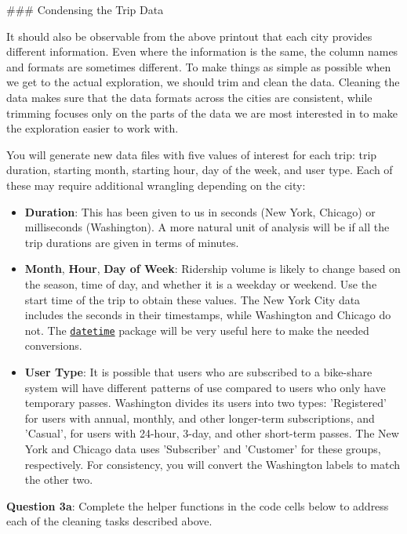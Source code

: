 \documentclass[11pt]{article}
\providecommand{\tightlist}{%
      \setlength{\itemsep}{0pt}\setlength{\parskip}{0pt}}
\begin{document}
 \#\#\# Condensing the Trip Data

It should also be observable from the above printout that each city
provides different information. Even where the information is the same,
the column names and formats are sometimes different. To make things as
simple as possible when we get to the actual exploration, we should trim
and clean the data. Cleaning the data makes sure that the data formats
across the cities are consistent, while trimming focuses only on the
parts of the data we are most interested in to make the exploration
easier to work with.

You will generate new data files with five values of interest for each
trip: trip duration, starting month, starting hour, day of the week, and
user type. Each of these may require additional wrangling depending on
the city:

\begin{itemize}
\tightlist
\item
  \textbf{Duration}: This has been given to us in seconds (New York,
  Chicago) or milliseconds (Washington). A more natural unit of analysis
  will be if all the trip durations are given in terms of minutes.
\item
  \textbf{Month}, \textbf{Hour}, \textbf{Day of Week}: Ridership volume
  is likely to change based on the season, time of day, and whether it
  is a weekday or weekend. Use the start time of the trip to obtain
  these values. The New York City data includes the seconds in their
  timestamps, while Washington and Chicago do not. The
  \href{https://docs.python.org/3/library/datetime.html}{\texttt{datetime}}
  package will be very useful here to make the needed conversions.
\item
  \textbf{User Type}: It is possible that users who are subscribed to a
  bike-share system will have different patterns of use compared to
  users who only have temporary passes. Washington divides its users
  into two types: 'Registered' for users with annual, monthly, and other
  longer-term subscriptions, and 'Casual', for users with 24-hour,
  3-day, and other short-term passes. The New York and Chicago data uses
  'Subscriber' and 'Customer' for these groups, respectively. For
  consistency, you will convert the Washington labels to match the other
  two.
\end{itemize}

\textbf{Question 3a}: Complete the helper functions in the code cells
below to address each of the cleaning tasks described above.
\end{document}

